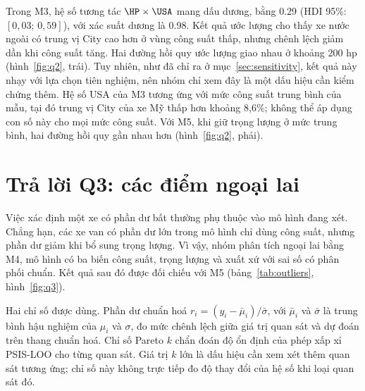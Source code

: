 \documentclass[12pt,a4paper]{report}
\begin{document}
Trong M3, hệ số tương tác $\HP \times \USA$ mang dấu dương, bằng \num{0.29} (HDI
95\%: $[0{,}03;\, 0{,}59]$), với xác suất dương là \num{0.98}. Kết quả ước lượng
cho thấy xe nước ngoài có trung vị City cao hơn ở vùng công suất thấp,
nhưng chênh lệch giảm dần khi công suất tăng. Hai đường hồi quy ước lượng giao
nhau ở khoảng 200 hp
(hình~\ref{fig:q2}, trái). Tuy nhiên, như đã chỉ ra ở mục~\ref{sec:sensitivity},
kết quả này nhạy với lựa chọn tiên nghiệm, nên nhóm chỉ xem đây là một dấu hiệu
cần kiểm chứng thêm. Hệ số USA của M3 tương ứng với mức công suất trung bình
của mẫu, tại đó trung vị City của xe Mỹ thấp hơn khoảng 8{,}6\%; không thể áp
dụng con số này cho mọi mức công suất. Với M5, khi giữ trọng lượng ở mức trung
bình, hai đường hồi quy gần nhau hơn (hình~\ref{fig:q2}, phải).


\section{Trả lời Q3: các điểm ngoại lai}
\label{sec:q3}

Việc xác định một xe có phần dư bất thường phụ thuộc vào mô hình đang xét.
Chẳng hạn, các xe van có phần dư lớn trong mô hình chỉ dùng công suất, nhưng
phần dư giảm khi bổ sung trọng lượng. Vì vậy, nhóm phân tích ngoại lai bằng
M4, mô hình có ba biến công suất, trọng lượng và xuất xứ với sai số có phân
phối chuẩn.
Kết quả sau đó được đối chiếu với M5 (bảng~\ref{tab:outliers},
hình~\ref{fig:q3}).

Hai chỉ số được dùng. Phần dư chuẩn hoá $r_i = (y_i - \bar{\mu}_i)/\bar{\sigma}$,
với $\bar{\mu}_i$ và $\bar{\sigma}$ là trung bình hậu nghiệm của $\mu_i$ và
$\sigma$, đo mức chênh lệch giữa giá trị quan sát và dự đoán trên thang chuẩn
hoá. Chỉ số Pareto $k$ chẩn đoán độ ổn định của phép xấp xỉ PSIS-LOO cho từng
quan sát. Giá trị $k$ lớn là dấu hiệu cần xem xét thêm quan sát tương ứng; chỉ
số này không trực tiếp đo độ thay đổi của hệ số khi loại quan sát đó.
\end{document}
